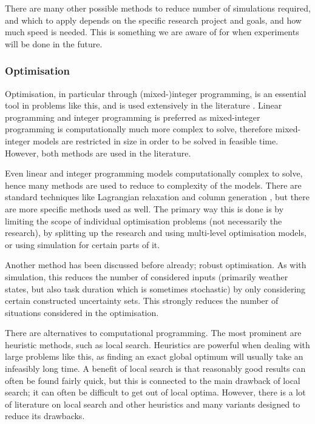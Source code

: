 \documentclass[a4paper,12pt]{article}
\begin{document}
There are many other possible methods to reduce number of simulations required, and which to apply depends on the specific research project and goals, and how much speed is needed. This is something we are aware of for when experiments will be done in the future. 

\bigskip

\subsubsection{Optimisation} \label{ss:opt}
Optimisation, in particular through (mixed-)integer programming, is an essential tool in problems like this, and is used extensively in the literature \cite{nemhauser1999integer,lee2011mixed}. Linear programming and integer programming is preferred as mixed-integer programming is computationally much more complex to solve, therefore mixed-integer models are restricted in size in order to be solved in feasible time. However, both methods are used in the literature.

Even linear and integer programming models computationally complex to solve, hence many methods are used to reduce to complexity of the models. There are standard techniques like Lagrangian relaxation \cite{fisher1981lagrangian} and column generation \cite{barnhart1998branch}, but there are more specific methods used as well. The primary way this is done is by limiting the scope of individual optimisation problems (not necessarily the research), by splitting up the research and using multi-level optimisation models, or using simulation for certain parts of it. 

Another method has been discussed before already; robust optimisation. As with simulation, this reduces the number of considered inputs (primarily weather states, but also task duration which is sometimes stochastic) by only considering certain constructed uncertainty sets. This strongly reduces the number of situations considered in the optimisation. 

There are alternatives to computational programming. The most prominent are heuristic methods, such as local search. Heuristics are powerful when dealing with large problems like this, as finding an exact global optimum will usually take an infeasibly long time. A benefit of local search is that reasonably good results can often be found fairly quick, but this is connected to the main drawback of local search; it can often be difficult to get out of local optima. However, there is a lot of literature on local search and other heuristics and many variants designed to reduce its drawbacks. 
\end{document}
